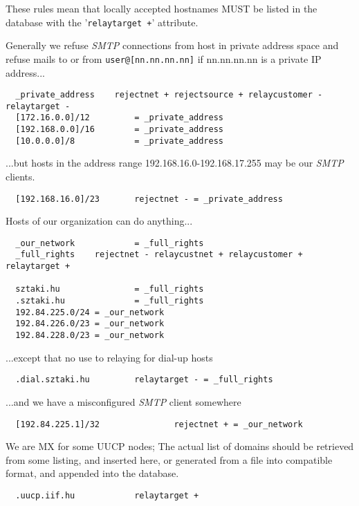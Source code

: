 These rules mean that locally accepted hostnames MUST be listed in
the database with the '{\tt relaytarget +}' attribute.

Generally we refuse {\em SMTP\/} connections from host in private address space
and refuse mails to or from {\tt user@[nn.nn.nn.nn]} if nn.nn.nn.nn is a
private IP address...

\begin{verbatim}
  _private_address    rejectnet + rejectsource + relaycustomer - relaytarget -
  [172.16.0.0]/12         = _private_address
  [192.168.0.0]/16        = _private_address
  [10.0.0.0]/8            = _private_address
\end{verbatim}


...but hosts in the address range 192.168.16.0-192.168.17.255 may be
our {\em SMTP\/} clients.

\begin{verbatim}
  [192.168.16.0]/23       rejectnet - = _private_address
\end{verbatim}


Hosts of our organization can do anything...

\begin{verbatim}
  _our_network            = _full_rights
  _full_rights    rejectnet - relaycustnet + relaycustomer + relaytarget +

  sztaki.hu               = _full_rights
  .sztaki.hu              = _full_rights
  192.84.225.0/24 = _our_network
  192.84.226.0/23 = _our_network
  192.84.228.0/23 = _our_network
\end{verbatim}


...except that no use to relaying for dial-up hosts

\begin{verbatim}
  .dial.sztaki.hu         relaytarget - = _full_rights
\end{verbatim}


...and we have a misconfigured {\em SMTP\/} client somewhere

\begin{verbatim}
  [192.84.225.1]/32               rejectnet + = _our_network
\end{verbatim}

We are MX for some UUCP nodes;  The actual list of domains should
be retrieved from some listing, and inserted here, or generated from
a file into compatible format, and appended into the database.

\begin{verbatim}
  .uucp.iif.hu            relaytarget +
\end{verbatim}


